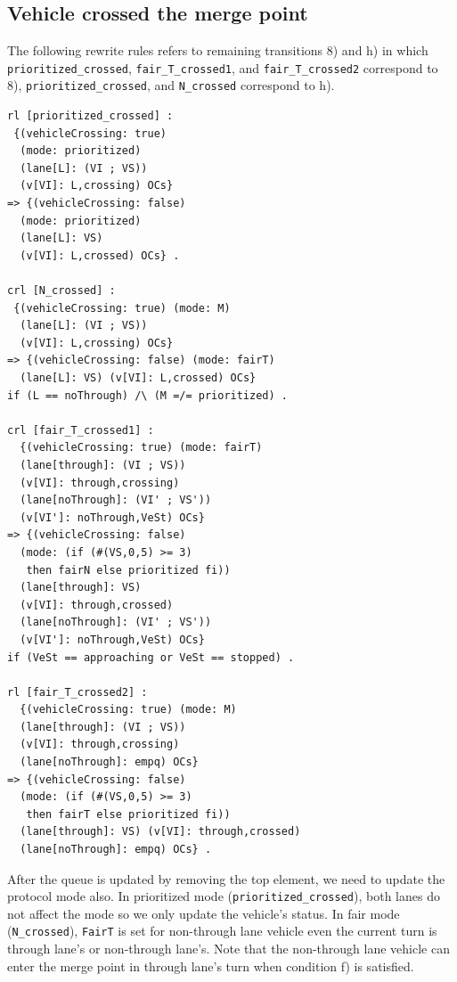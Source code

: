 \documentclass[10pt, conference, compsocconf]{IEEEtran}
\begin{document}
\subsection{Vehicle crossed the merge point}
The following rewrite rules refers to remaining transitions 8) and h) in which
\verb!prioritized_crossed!, \verb!fair_T_crossed1!, and \verb!fair_T_crossed2!
correspond to 8), \verb!prioritized_crossed!, and \verb!N_crossed! correspond to h).

\begin{small}
  \begin{verbatim}
rl [prioritized_crossed] : 
 {(vehicleCrossing: true) 
  (mode: prioritized) 
  (lane[L]: (VI ; VS)) 
  (v[VI]: L,crossing) OCs} 
=> {(vehicleCrossing: false) 
  (mode: prioritized) 
  (lane[L]: VS) 
  (v[VI]: L,crossed) OCs} .

crl [N_crossed] : 
 {(vehicleCrossing: true) (mode: M) 
  (lane[L]: (VI ; VS)) 
  (v[VI]: L,crossing) OCs} 
=> {(vehicleCrossing: false) (mode: fairT) 
  (lane[L]: VS) (v[VI]: L,crossed) OCs} 
if (L == noThrough) /\ (M =/= prioritized) .

crl [fair_T_crossed1] : 
  {(vehicleCrossing: true) (mode: fairT) 
  (lane[through]: (VI ; VS)) 
  (v[VI]: through,crossing) 
  (lane[noThrough]: (VI' ; VS')) 
  (v[VI']: noThrough,VeSt) OCs} 
=> {(vehicleCrossing: false) 
  (mode: (if (#(VS,0,5) >= 3) 
   then fairN else prioritized fi))
  (lane[through]: VS) 
  (v[VI]: through,crossed)
  (lane[noThrough]: (VI' ; VS')) 
  (v[VI']: noThrough,VeSt) OCs} 
if (VeSt == approaching or VeSt == stopped) .

rl [fair_T_crossed2] : 
  {(vehicleCrossing: true) (mode: M)
  (lane[through]: (VI ; VS)) 
  (v[VI]: through,crossing) 
  (lane[noThrough]: empq) OCs} 
=> {(vehicleCrossing: false) 
  (mode: (if (#(VS,0,5) >= 3) 
   then fairT else prioritized fi))
  (lane[through]: VS) (v[VI]: through,crossed) 
  (lane[noThrough]: empq) OCs} .    
  \end{verbatim}
\end{small}

After the queue is updated by removing the top element, we need to update the protocol mode also.
In prioritized mode (\verb!prioritized_crossed!), both lanes do not affect the mode so we only
update the vehicle's status.
In fair mode (\verb!N_crossed!), \verb!FairT! is set for non-through lane vehicle even 
the current turn is through lane's or non-through lane's.
Note that the non-through lane vehicle can enter the merge point in 
through lane's turn when condition f) is satisfied.
\end{document}
